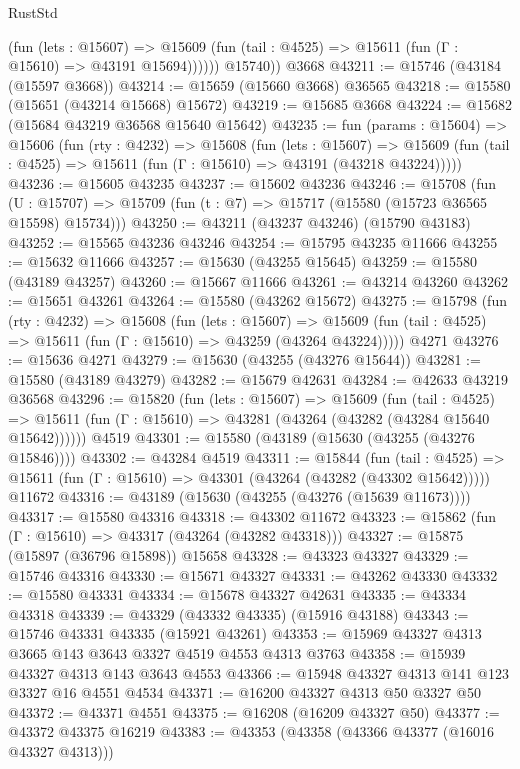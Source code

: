 \begin{lexlean}{RustStd}
\begin{coremodule}
              (fun (lets : @15607) =>
              @15609 (fun (tail : @4525) => @15611 (fun (Γ : @15610) => @43191 @15694))))))
        @15740))
    @3668
@43211 := @15746 (@43184 (@15597 @3668))
@43214 := @15659 (@15660 @3668) @36565
@43218 := @15580 (@15651 (@43214 @15668) @15672)
@43219 := @15685 @3668
@43224 := @15682 (@15684 @43219 @36568 @15640 @15642)
@43235 := fun (params : @15604) =>
  @15606
    (fun (rty : @4232) =>
    @15608
      (fun (lets : @15607) =>
      @15609 (fun (tail : @4525) => @15611 (fun (Γ : @15610) => @43191 (@43218 @43224)))))
@43236 := @15605 @43235
@43237 := @15602 @43236
@43246 := @15708
    (fun (U : @15707) => @15709 (fun (t : @7) => @15717 (@15580 (@15723 @36565 @15598) @15734)))
@43250 := @43211 (@43237 @43246) (@15790 @43183)
@43252 := @15565 @43236 @43246
@43254 := @15795 @43235 @11666
@43255 := @15632 @11666
@43257 := @15630 (@43255 @15645)
@43259 := @15580 (@43189 @43257)
@43260 := @15667 @11666
@43261 := @43214 @43260
@43262 := @15651 @43261
@43264 := @15580 (@43262 @15672)
@43275 := @15798
    (fun (rty : @4232) =>
    @15608
      (fun (lets : @15607) =>
      @15609 (fun (tail : @4525) => @15611 (fun (Γ : @15610) => @43259 (@43264 @43224)))))
    @4271
@43276 := @15636 @4271
@43279 := @15630 (@43255 (@43276 @15644))
@43281 := @15580 (@43189 @43279)
@43282 := @15679 @42631
@43284 := @42633 @43219 @36568
@43296 := @15820
    (fun (lets : @15607) =>
    @15609
      (fun (tail : @4525) =>
      @15611 (fun (Γ : @15610) => @43281 (@43264 (@43282 (@43284 @15640 @15642))))))
    @4519
@43301 := @15580 (@43189 (@15630 (@43255 (@43276 @15846))))
@43302 := @43284 @4519
@43311 := @15844
    (fun (tail : @4525) => @15611 (fun (Γ : @15610) => @43301 (@43264 (@43282 (@43302 @15642)))))
    @11672
@43316 := @43189 (@15630 (@43255 (@43276 (@15639 @11673))))
@43317 := @15580 @43316
@43318 := @43302 @11672
@43323 := @15862 (fun (Γ : @15610) => @43317 (@43264 (@43282 @43318)))
@43327 := @15875 (@15897 (@36796 @15898)) @15658
@43328 := @43323 @43327
@43329 := @15746 @43316
@43330 := @15671 @43327
@43331 := @43262 @43330
@43332 := @15580 @43331
@43334 := @15678 @43327 @42631
@43335 := @43334 @43318
@43339 := @43329 (@43332 @43335) (@15916 @43188)
@43343 := @15746 @43331 @43335 (@15921 @43261)
@43353 := @15969 @43327 @4313 @3665 @143 @3643 @3327 @4519 @4553 @4313 @3763
@43358 := @15939 @43327 @4313 @143 @3643 @4553
@43366 := @15948 @43327 @4313 @141 @123 @3327 @16 @4551 @4534
@43371 := @16200 @43327 @4313 @50 @3327 @50
@43372 := @43371 @4551
@43375 := @16208 (@16209 @43327 @50)
@43377 := @43372 @43375 @16219
@43383 := @43353 (@43358 (@43366 @43377 (@16016 @43327 @4313)))

\end{coremodule}
\end{lexlean}
